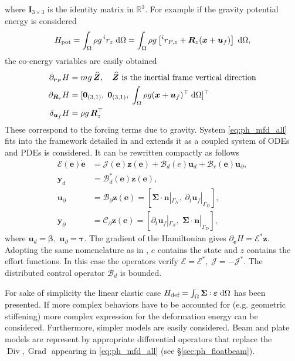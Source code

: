 \documentclass{svjour3}                     %
\newcommand{\secref}[1]{\S\ref{#1}}
\DeclareMathOperator*{\Grad}{Grad}
\DeclareMathOperator*{\Div}{Div}
\def\onedot{$\mathsurround0pt\ldotp$}
\def\cddot{%
	\mathbin{\vcenter{\baselineskip.67ex
			\hbox{\onedot}\hbox{\onedot}}%
}}
\begin{document}
where $\bm{I}_{3\times 3}$ is the identity matrix in $\mathbb{R}^3$. For example if the gravity potential energy is considered
\begin{equation*}
	H_{\text{pot}} = \int_{\Omega} \rho g \, ^i r_z \d{\Omega} = \int_{\Omega} \rho g \left[ ^i r_{P, z} +\bm{R}_z (\bm{x} + \bm{u}_f) \right] \d{\Omega},
\end{equation*}
the co-energy variables are easily obtained
\begin{align*}
\partial_{\bm{r}_P}H &= m g \, \widehat{\bm{Z}}, \quad \text{$\widehat{\bm{Z}}$ is the inertial frame vertical direction}\\
\partial_{\bm{R}_\text{v}}H &= [\bm{0}_{(3, 1)}, \; \bm{0}_{(3, 1)}, \; \int_{\Omega} \rho g (\bm{x} + \bm{u}_f)^\top \d{\Omega}]^\top \\
\delta_{\bm{u}_f} H &= \rho g \, \bm{R}_z^\top
\end{align*}
These correspond to the forcing terms due to gravity. System \eqref{eq:ph_mfd_all} fits into the framework detailed in \cite{mehrmann2019structurepreserving} and extends it as a coupled system of ODEs and PDEs is considered. It can be rewritten compactly as follows
\begin{equation}
\label{eq:MFD_pHDAE}
\begin{aligned}
\bm{\mathcal{E}}(\bm{e}) \dot{\bm{e}} &= \bm{\mathcal{J}}(\bm{e}) \bm{z}(\bm{e}) + \bm{\mathcal{B}}_d(e) \bm{u}_d + \bm{\mathcal{B}}_r(\bm{e}) \bm{u}_\partial, \\
\bm{y}_d &= \bm{\mathcal{B}}_d^*(\bm{e}) \bm{z}(\bm{e}), \\
\bm{u}_\partial &= \bm{\mathcal{B}}_{\partial} \bm{z}(\bm{e}) =  [\bm\Sigma \cdot \bm{n}|_{\Gamma_N}, \; \partial_t \bm{u}_f|_{\Gamma_D}], \\
\bm{y}_\partial &= \bm{\mathcal{C}}_{\partial} \bm{z}(\bm{e}) = [\partial_t \bm{u}_f|_{\Gamma_N}, \; \bm\Sigma \cdot \bm{n}|_{\Gamma_D}],
\end{aligned}
\end{equation}
where $\bm{u}_d = \bm\beta, \; \bm{u}_\partial = \bm\tau$. The gradient of the Hamiltonian  gives $\partial_{\bm{e}} H = \bm{\mathcal{E}}^* \bm{z}$. Adopting the same nomenclature as in \cite{mehrmann2019structurepreserving}, $e$ contains the state and $z$ contains the effort functions. In this case the operators verify $\bm{\mathcal{E}} = \bm{\mathcal{E}}^*, \; \bm{\mathcal{J}} = -\bm{\mathcal{J}}^*$. The distributed control operator $\bm{\mathcal{B}}_d$ is bounded. 

\begin{remark}
For sake of simplicity the linear elastic case $H_{\text{def}}=\int_{\Omega} \bm\Sigma \cddot \bm\varepsilon \d{\Omega}$ has been presented. If more complex behaviors have to be accounted for (e.g. geometric stiffening) more complex expression for the deformation energy can be considered. Furthermore, simpler models are easily considered. Beam and plate models are represent by appropriate differential operators that replace the $\Div, \Grad$ appearing in \eqref{eq:ph_mfd_all} (see \secref{sec:ph_floatbeam}).
\end{remark}
\end{document}
